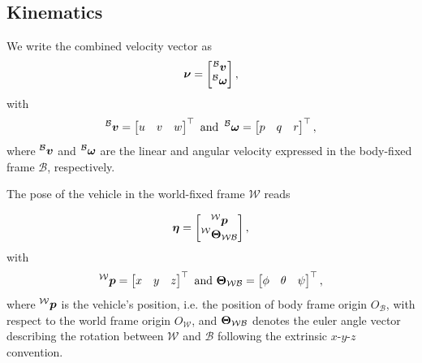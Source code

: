\subsection{Kinematics}

We write the combined velocity vector \nub as
\begin{equation}
	\mbox{$\bm{\nu}$} = 
	\begin{bmatrix}
		\prescript{\mathcal{B}}{}{\mbox{$\bm{v}$}} \\
		\prescript{\mathcal{B}}{}{\mbox{$\bm{\omega}$}}
	\end{bmatrix}
	,
\end{equation}
with 
\begin{equation}
	\label{eq:velocities-in-body-frame}
	\prescript{\mathcal{B}}{}{\mbox{$\bm{v}$}} = 
	\begin{bmatrix}
		u & v & w
	\end{bmatrix}^\top
	\text{ and }
	\prescript{\mathcal{B}}{}{\mbox{$\bm{\omega}$}} = 
	\begin{bmatrix}
		p & q & r
	\end{bmatrix}^\top
	,
\end{equation}
where $\prescript{\mathcal{B}}{}{\mbox{$\bm{v}$}}$ and $\prescript{\mathcal{B}}{}{\mbox{$\bm{\omega}$}}$ are the linear and angular velocity expressed in the body-fixed frame $\mathcal{B}$, respectively.

The pose of the vehicle in the world-fixed frame $\mathcal{W}$ reads

\begin{equation}
	\etab = 
	\begin{bmatrix}
		\prescript{\mathcal{W}}{}{\pbo} \\
		\prescript{\mathcal{W}}{}{\Theb_{\mathcal{W}\mathcal{B}}}
	\end{bmatrix}
	,
\end{equation}
with
\begin{equation}
	\prescript{\mathcal{W}}{}{\mbox{$\bm{p}$}} = 
	\begin{bmatrix}
		x & y & z
	\end{bmatrix}^\top
	\text{ and }
	\mbox{$\bm{\Theta}$}_{\mathcal{W}\mathcal{B}} =
	\begin{bmatrix}
		\phi & \theta & \psi
	\end{bmatrix}^\top,
\end{equation}
where $\prescript{\mathcal{W}}{}{\mbox{$\bm{p}$}}$ is the vehicle's position, i.e. the position of body frame origin $O_\mathcal{B}$, with respect to the world frame origin $O_\mathcal{W}$, and $\mbox{$\bm{\Theta}$}_{\mathcal{W}\mathcal{B}}$ denotes the euler angle vector describing the rotation between $\mathcal{W}$ and $\mathcal{B}$ following the extrinsic $x$-$y$-$z$ convention.

